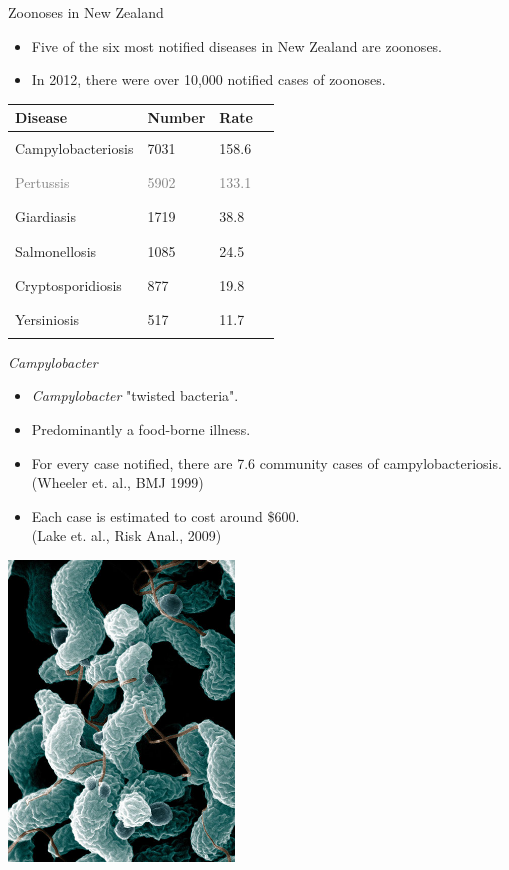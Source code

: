 \documentclass[]{beamer}
\begin{document}
\begin{frame}{Zoonoses in New Zealand}
\begin{itemize}
\item Five of the six most notified diseases in New Zealand are zoonoses.\
\gap
\item In 2012, there were over 10,000 notified cases of zoonoses.
\end{itemize}
\begin{center}
\begin{tabular}{llll}
Disease & Number & Rate & \\
\hline
Campylobacteriosis & 7031 & 158.6 & \rule{3.515cm}{0.3cm}\\
\textcolor{grey}{Pertussis} & \textcolor{grey}{5902} & \textcolor{grey}{133.1} & \color{grey}\rule{2.951cm}{0.3cm}\\
Giardiasis & 1719 & 38.8 & \rule{0.860cm}{0.3cm}\\
Salmonellosis & 1085 & 24.5 & \rule{0.542cm}{0.3cm}\\
Cryptosporidiosis & 877 & 19.8 & \rule{0.439cm}{0.3cm}\\
Yersiniosis & 517 & 11.7 & \rule{0.258cm}{0.3cm}\\
\end{tabular}
\end{center}
\end{frame}

\begin{frame}{\emph{Campylobacter}}
\begin{minipage}{0.55\linewidth}
\begin{itemize}
\item \emph{Campylobacter} "twisted bacteria".
\gap
\item Predominantly a food-borne illness.
\gap
\item For every case notified, there are 7.6 community cases of campylobacteriosis.\\
{\small (Wheeler et. al., BMJ 1999)}
\gap
\item Each case is estimated to cost around \$600.\\
{\small (Lake et. al., Risk Anal., 2009)}
\end{itemize}
\end{minipage}
\begin{minipage}{0.4\linewidth}
\includegraphics[width=6cm, trim=0 0 0 7.8]{Pictures/campy.jpg}
\end{minipage}
\end{frame}
\end{document}
